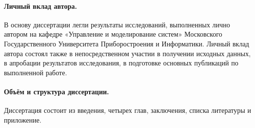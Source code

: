 \paragraph{Личный вклад автора.}
В основу диссертации легли результаты исследований, выполненных лично автором на кафедре «Управление и моделирование систем» Московского Государственного
Университета Приборостроения и Информатики. Личный вклад автора состоял также в непосредственном участии в получении исходных данных, в апробации результатов исследования,
в подготовке основных публикаций по выполненной работе.

\paragraph{Объём и структура диссертации.}
Диссертация состоит из введения, четырех глав, заключения, списка литературы и приложение.

\newpage
